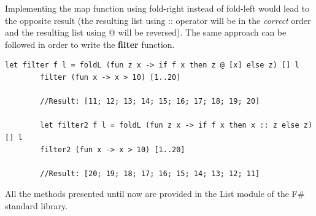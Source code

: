     Implementing the map function using fold-right instead of fold-left would lead to the opposite result (the resulting list using :: operator will be in the \textit{correct} order and the resulting list using @ will be reversed).\newline\newline
    The same approach can be followed in order to write the \textbf{filter} function.
    \begin{lstlisting}[style = FSharpStyle]
        let filter f l = foldL (fun z x -> if f x then z @ [x] else z) [] l
        filter (fun x -> x > 10) [1..20]

        //Result: [11; 12; 13; 14; 15; 16; 17; 18; 19; 20]

        let filter2 f l = foldL (fun z x -> if f x then x :: z else z) [] l
        filter2 (fun x -> x > 10) [1..20]

        //Result: [20; 19; 18; 17; 16; 15; 14; 13; 12; 11]
    \end{lstlisting}
    All the methods presented until now are provided in the List module of the F\# standard library.
